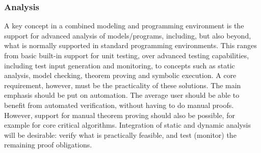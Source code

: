 \subsubsection{Analysis}

A key concept in a combined modeling and programming environment is 
the support for advanced analysis of models/programs, including, 
but also beyond, what is normally supported in standard programming 
environments. This ranges from basic built-in support for unit 
testing, over advanced testing capabilities, including test input 
generation and monitoring, to concepts such as static analysis, 
model checking, theorem proving and symbolic execution. A core 
requirement, however, must be the practicality of these solutions. 
The main emphasis should be put on automation. The average user 
should be able to benefit from automated verification, without 
having to do manual proofs. However, support for manual theorem 
proving should also be possible, for example for core critical 
algorithms. Integration of static and dynamic analysis will be 
desirable: verify what is practically feasible, and test (monitor) 
the remaining proof obligations.




